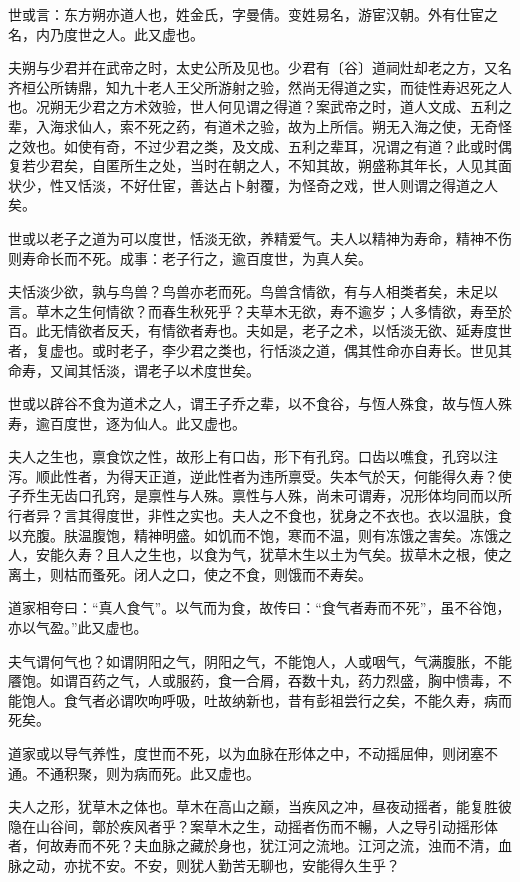 \documentclass[]{article}
\begin{document}
世或言：东方朔亦道人也，姓金氏，字曼倩。变姓易名，游宦汉朝。外有仕宦之名，内乃度世之人。此又虚也。

夫朔与少君并在武帝之时，太史公所及见也。少君有〔谷〕道祠灶却老之方，又名齐桓公所铸鼎，知九十老人王父所游射之验，然尚无得道之实，而徒性寿迟死之人也。况朔无少君之方术效验，世人何见谓之得道？案武帝之时，道人文成、五利之辈，入海求仙人，索不死之药，有道术之验，故为上所信。朔无入海之使，无奇怪之效也。如使有奇，不过少君之类，及文成、五利之辈耳，况谓之有道？此或时偶复若少君矣，自匿所生之处，当时在朝之人，不知其故，朔盛称其年长，人见其面状少，性又恬淡，不好仕宦，善达占卜射覆，为怪奇之戏，世人则谓之得道之人矣。

世或以老子之道为可以度世，恬淡无欲，养精爱气。夫人以精神为寿命，精神不伤则寿命长而不死。成事：老子行之，逾百度世，为真人矣。

夫恬淡少欲，孰与鸟兽？鸟兽亦老而死。鸟兽含情欲，有与人相类者矣，未足以言。草木之生何情欲？而春生秋死乎？夫草木无欲，寿不逾岁；人多情欲，寿至於百。此无情欲者反夭，有情欲者寿也。夫如是，老子之术，以恬淡无欲、延寿度世者，复虚也。或时老子，李少君之类也，行恬淡之道，偶其性命亦自寿长。世见其命寿，又闻其恬淡，谓老子以术度世矣。

世或以辟谷不食为道术之人，谓王子乔之辈，以不食谷，与恆人殊食，故与恆人殊寿，逾百度世，逐为仙人。此又虚也。

夫人之生也，禀食饮之性，故形上有口齿，形下有孔窍。口齿以噍食，孔窍以注泻。顺此性者，为得天正道，逆此性者为违所禀受。失本气於天，何能得久寿？使子乔生无齿口孔窍，是禀性与人殊。禀性与人殊，尚未可谓寿，况形体均同而以所行者异？言其得度世，非性之实也。夫人之不食也，犹身之不衣也。衣以温肤，食以充腹。肤温腹饱，精神明盛。如饥而不饱，寒而不温，则有冻饿之害矣。冻饿之人，安能久寿？且人之生也，以食为气，犹草木生以土为气矣。拔草木之根，使之离土，则枯而蚤死。闭人之口，使之不食，则饿而不寿矣。

道家相夸曰：``真人食气''。以气而为食，故传曰：``食气者寿而不死''，虽不谷饱，亦以气盈。''此又虚也。

夫气谓何气也？如谓阴阳之气，阴阳之气，不能饱人，人或咽气，气满腹胀，不能餍饱。如谓百药之气，人或服药，食一合屑，吞数十丸，药力烈盛，胸中愦毒，不能饱人。食气者必谓吹呴呼吸，吐故纳新也，昔有彭祖尝行之矣，不能久寿，病而死矣。

道家或以导气养性，度世而不死，以为血脉在形体之中，不动摇屈伸，则闭塞不通。不通积聚，则为病而死。此又虚也。

夫人之形，犹草木之体也。草木在高山之巅，当疾风之冲，昼夜动摇者，能复胜彼隐在山谷间，鄣於疾风者乎？案草木之生，动摇者伤而不暢，人之导引动摇形体者，何故寿而不死？夫血脉之藏於身也，犹江河之流地。江河之流，浊而不清，血脉之动，亦扰不安。不安，则犹人勤苦无聊也，安能得久生乎？
\end{document}
